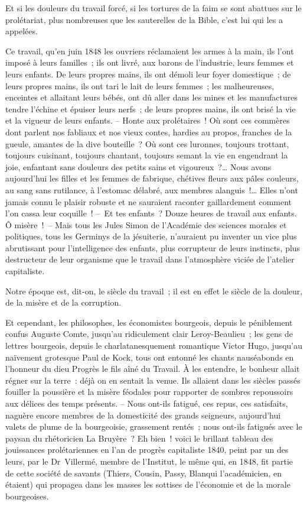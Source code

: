 \documentclass[french,twoside]{book} %
\begin{document}
Et si les douleurs du travail forcé, si les tortures de la faim se sont abattues sur le prolétariat, plus nombreuses que les sauterelles de la Bible, c’est lui qui les a appelées.\par
Ce travail, qu’en juin 1848 les ouvriers réclamaient les armes à la main, ils l’ont imposé à leurs familles ; ils ont livré, aux barons de l’industrie, leurs femmes et leurs enfants. De leurs propres mains, ils ont démoli leur foyer domestique ; de leurs propres mains, ils ont tari le lait de leurs femmes ; les malheureuses, enceintes et allaitant leurs bébés, ont dû aller dans les mines et les manufactures tendre l’échine et épuiser leurs nerfs ; de leurs propres mains, ils ont brisé la vie et la vigueur de leurs enfants. – Honte aux prolétaires ! Où sont ces commères dont parlent nos fabliaux et nos vieux contes, hardies au propos, franches de la gueule, amantes de la dive bouteille ? Où sont ces luronnes, toujours trottant, toujours cuisinant, toujours chantant, toujours semant la vie en engendrant la joie, enfantant sans douleurs des petits sains et vigoureux ?… Nous avons aujourd’hui les filles et les femmes de fabrique, chétives fleurs aux pâles couleurs, au sang sans rutilance, à l’estomac délabré, aux membres alanguis !… Elles n’ont jamais connu le plaisir robuste et ne sauraient raconter gaillardement comment l’on cassa leur coquille ! – Et tes enfants ? Douze heures de travail aux enfants. Ô misère ! – Mais tous les Jules Simon de l’Académie des sciences morales et politiques, tous les Germinys de la jésuiterie, n’auraient pu inventer un vice plus abrutissant pour l’intelligence des enfants, plus corrupteur de leurs instincts, plus destructeur de leur organisme que le travail dans l’atmosphère viciée de l’atelier capitaliste.\par
Notre époque est, dit-on, le siècle du travail ; il est en effet le siècle de la douleur, de la misère et de la corruption.\par
Et cependant, les philosophes, les économistes bourgeois, depuis le péniblement confus Auguste Comte, jusqu’au ridiculement clair Leroy-Beaulieu ; les gens de lettres bourgeois, depuis le charlatanesquement romantique Victor Hugo, jusqu’au naïvement grotesque Paul de Kock, tous ont entonné les chants nauséabonds en l’honneur du dieu Progrès le fils aîné du Travail. À les entendre, le bonheur allait régner sur la terre : déjà on en sentait la venue. Ils allaient dans les siècles passés fouiller la poussière et la misère féodales pour rapporter de sombres repoussoirs aux délices des temps présents. – Nous ont-ils fatigué, ces repus, ces satisfaits, naguère encore membres de la domesticité des grands seigneurs, aujourd’hui valets de plume de la bourgeoisie, grassement rentés ; nous ont-ils fatigués avec le paysan du rhétoricien La Bruyère ? Eh bien ! voici le brillant tableau des jouissances prolétariennes en l’an de progrès capitaliste 1840, peint par un des leurs, par le Dr Villermé, membre de l’Institut, le même qui, en 1848, fit partie de cette société de savants (Thiers, Cousin, Passy, Blanqui l’académicien, en étaient) qui propagea dans les masses les sottises de l’économie et de la morale bourgeoises.\par
\end{document}
